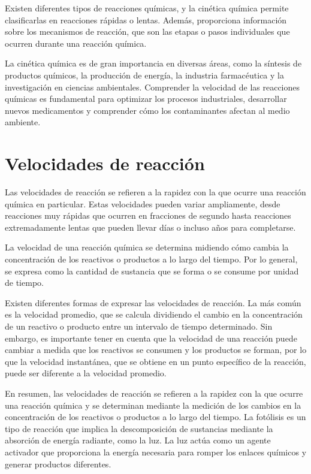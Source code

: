 Existen diferentes tipos de reacciones químicas, y la cinética química permite clasificarlas en reacciones rápidas o lentas. Además, proporciona información sobre los mecanismos de reacción, que son las etapas o pasos individuales que ocurren durante una reacción química.

La cinética química es de gran importancia en diversas áreas, como la síntesis de productos químicos, la producción de energía, la industria farmacéutica y la investigación en ciencias ambientales. Comprender la velocidad de las reacciones químicas es fundamental para optimizar los procesos industriales, desarrollar nuevos medicamentos y comprender cómo los contaminantes afectan al medio ambiente.


\section{Velocidades de reacción}\label{vreac}
Las velocidades de reacción se refieren a la rapidez con la que ocurre una reacción química en particular. Estas velocidades pueden variar ampliamente, desde reacciones muy rápidas que ocurren en fracciones de segundo hasta reacciones extremadamente lentas que pueden llevar días o incluso años para completarse.

La velocidad de una reacción química se determina midiendo cómo cambia la concentración de los reactivos o productos a lo largo del tiempo. Por lo general, se expresa como la cantidad de sustancia que se forma o se consume por unidad de tiempo.

Existen diferentes formas de expresar las velocidades de reacción. La más común es la velocidad promedio, que se calcula dividiendo el cambio en la concentración de un reactivo o producto entre un intervalo de tiempo determinado. Sin embargo, es importante tener en cuenta que la velocidad de una reacción puede cambiar a medida que los reactivos se consumen y los productos se forman, por lo que la velocidad instantánea, que se obtiene en un punto específico de la reacción, puede ser diferente a la velocidad promedio.

En resumen, las velocidades de reacción se refieren a la rapidez con la que ocurre una reacción química y se determinan mediante la medición de los cambios en la concentración de los reactivos o productos a lo largo del tiempo. La fotólisis es un tipo de reacción que implica la descomposición de sustancias mediante la absorción de energía radiante, como la luz. La luz actúa como un agente activador que proporciona la energía necesaria para romper los enlaces químicos y generar productos diferentes.

